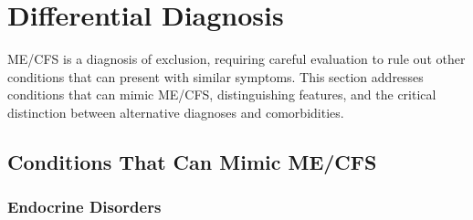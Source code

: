 \section{Differential Diagnosis}
\label{sec:differential}

ME/CFS is a diagnosis of exclusion, requiring careful evaluation to rule out other conditions that can present with similar symptoms. This section addresses conditions that can mimic ME/CFS, distinguishing features, and the critical distinction between alternative diagnoses and comorbidities.

\subsection{Conditions That Can Mimic ME/CFS}

\subsubsection{Endocrine Disorders}

